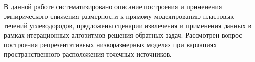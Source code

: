 В данной работе систематизировано описание построения и применения эмпирического снижения размерности к прямому моделированию пластовых течений углеводородов, предложены сценарии извлечения и применения данных в рамках итерационных алгоритмов решения обратных задач. Рассмотрен вопрос построения репрезентативных низкоразмерных моделях при вариациях пространственного расположения точечных источников.
